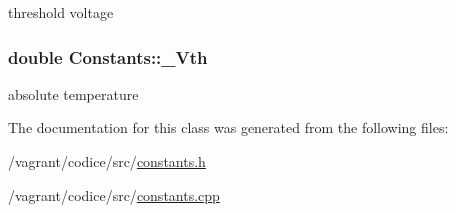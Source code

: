 threshold voltage \hypertarget{classConstants_a174ac7aef72e5eabc597bcc26c4c9455}{
\subsubsection[{\-\_\-\-Vth}]{\setlength{\rightskip}{0pt plus 5cm}double Constants\-::\-\_\-\-Vth\hspace{0.3cm}{\ttfamily [protected]}}}\label{classConstants_a174ac7aef72e5eabc597bcc26c4c9455}
absolute temperature 

The documentation for this class was generated from the following files\-:\begin{DoxyCompactItemize}
\item 
/vagrant/codice/src/\hyperlink{constants_8h}{constants.\-h}\item 
/vagrant/codice/src/\hyperlink{constants_8cpp}{constants.\-cpp}\end{DoxyCompactItemize}
